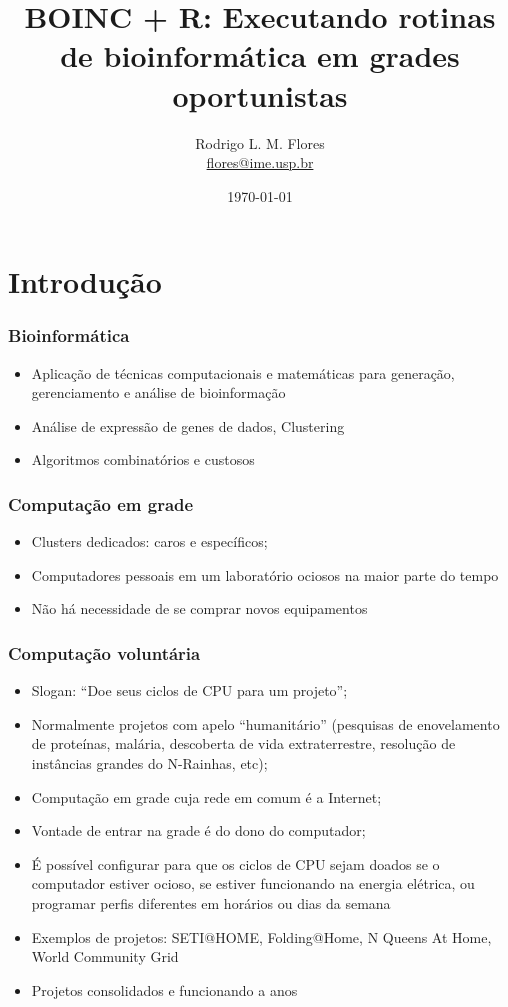 \documentclass{beamer}
\title{BOINC + R: Executando rotinas de bioinformática em grades oportunistas}
\author{Rodrigo L. M. Flores \\ \url{flores@ime.usp.br}}
\institute{Instituto de Matemática e Estatística\\Universidade de São Paulo}
\begin{document}
\date{\today}

\frame{\titlepage}

\frame{\tableofcontents}

\section{Introdução}

\begin{frame}
  \frametitle{Bioinformática}
  \begin{itemize}
    \item Aplicação de técnicas computacionais e matemáticas para generação, gerenciamento e análise de bioinformação 
    \item Análise de expressão de genes de dados, Clustering
    \item Algoritmos combinatórios e custosos
  \end{itemize} 
\end{frame}

\begin{frame}
  \frametitle{Computação em grade}
  \begin{itemize}
    \item Clusters dedicados: caros e específicos;
    \item Computadores pessoais em um laboratório ociosos na maior parte do tempo
    \item Não há necessidade de se comprar novos equipamentos
  \end{itemize}
\end{frame}

\begin{frame}
  \frametitle{Computação voluntária}
  \begin{itemize}
    \item Slogan: ``Doe seus ciclos de CPU para um projeto'';
    \item Normalmente projetos com apelo ``humanitário'' (pesquisas de enovelamento de proteínas, malária, descoberta de vida extraterrestre, resolução de instâncias grandes do N-Rainhas, etc);
    \item Computação em grade cuja rede em comum é a Internet; 
    \item Vontade de entrar na grade é do dono do computador;
    \item É possível configurar para que os ciclos de CPU sejam doados se o computador estiver ocioso, se estiver funcionando na energia elétrica, ou programar perfis diferentes em horários ou dias da semana
    \item Exemplos de projetos: SETI@HOME, Folding@Home, N Queens At Home, World Community Grid
    \item Projetos consolidados e funcionando a anos
  \end{itemize}
\end{frame}
\end{document}
